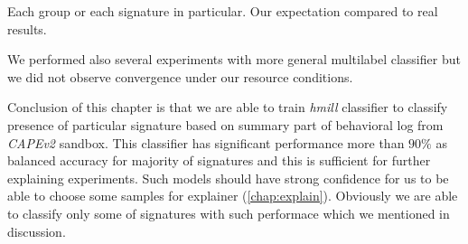 Each group or each signature in particular. Our expectation compared to real results.

We performed also several experiments with more general multilabel classifier but we did not observe convergence under our resource conditions.


Conclusion of this chapter is that we are able to train \emph{hmill} classifier to classify presence of particular signature based on summary part of behavioral log from \emph{CAPEv2} sandbox. This classifier has significant performance more than $90\%$ as balanced accuracy for majority of signatures and this is sufficient for further explaining experiments. Such models should have strong confidence for us to be able to choose some samples for explainer (\ref{chap:explain}). Obviously we are able to classify only some of signatures with such performace which we mentioned in discussion.













